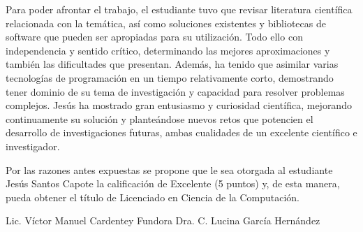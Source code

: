 \begin{opinion}
    Para poder afrontar el trabajo, el estudiante tuvo que revisar literatura científica relacionada con 
    la temática, así como soluciones existentes y bibliotecas de software que pueden ser apropiadas para 
    su utilización. Todo ello con independencia y sentido crítico, determinando las mejores aproximaciones 
    y también las dificultades que presentan. Además, ha tenido que asimilar varias tecnologías de 
    programación en un tiempo relativamente corto, demostrando tener dominio de su tema de investigación y 
    capacidad para resolver problemas complejos. Jesús ha mostrado gran entusiasmo y curiosidad científica, 
    mejorando continuamente su solución y planteándose nuevos retos que potencien el desarrollo de 
    investigaciones futuras, ambas cualidades de un excelente científico e investigador.

    Por las razones antes expuestas se propone que le sea otorgada al estudiante Jesús Santos Capote la 
    calificación de Excelente (5 puntos) y, de esta manera, pueda obtener el título de Licenciado en 
    Ciencia de la Computación.

    \vspace{1,0cm}

    Lic. Víctor Manuel Cardentey Fundora	\hspace{1,0cm}		Dra. C. Lucina García Hernández
\end{opinion}